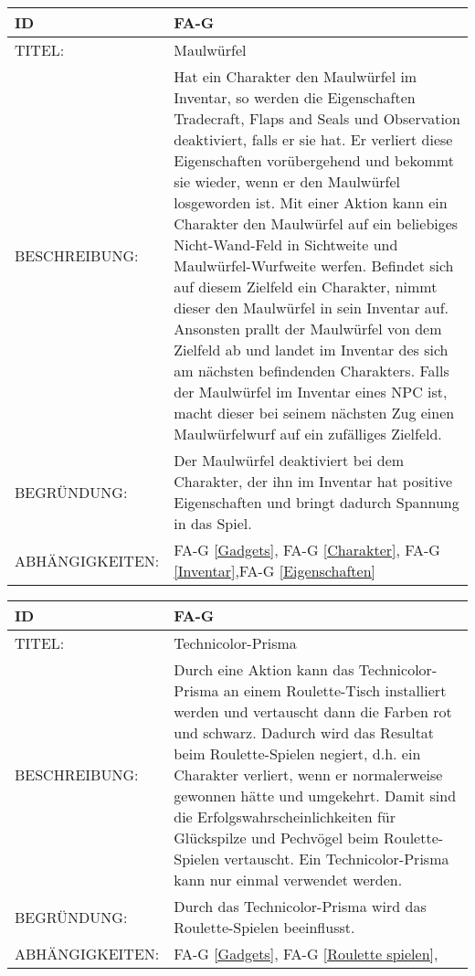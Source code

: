 \begin{tabularx}{16cm}{l|X}
	{table}\label{Maulwuerfel}
	\textbf{ID} & \textbf{FA-G \arabic{table}} \\
	\hline
	TITEL: & Maulwürfel \\
	\hline
	BESCHREIBUNG: & Hat ein Charakter den Maulwürfel im Inventar, so werden die Eigenschaften Tradecraft, Flaps and Seals und Observation deaktiviert, falls er sie hat. Er verliert diese Eigenschaften vorübergehend und bekommt sie wieder, wenn er den Maulwürfel losgeworden ist. Mit einer Aktion kann ein Charakter den Maulwürfel auf ein beliebiges Nicht-Wand-Feld in Sichtweite und Maulwürfel-Wurfweite werfen. Befindet sich auf diesem Zielfeld ein Charakter, nimmt dieser den Maulwürfel in sein Inventar auf. Ansonsten prallt der Maulwürfel von dem Zielfeld ab und landet im Inventar des sich am nächsten befindenden Charakters. Falls der Maulwürfel im Inventar eines NPC ist, macht dieser bei seinem nächsten Zug einen Maulwürfelwurf auf ein zufälliges Zielfeld. \\
	\hline
	BEGRÜNDUNG: &  Der Maulwürfel deaktiviert bei dem Charakter, der ihn im Inventar hat positive Eigenschaften und bringt dadurch Spannung in das Spiel. \\
	\hline
	ABHÄNGIGKEITEN: & FA-G \ref{Gadgets}, FA-G \ref{Charakter}, FA-G \ref{Inventar},FA-G \ref{Eigenschaften} \\
\end{tabularx}

\begin{tabularx}{16cm}{l|X}
	{table}\label{Technicolor-Prisma}
	\textbf{ID} & \textbf{FA-G \arabic{table}} \\
	\hline
	TITEL: & Technicolor-Prisma \\
	\hline
	BESCHREIBUNG: & Durch eine Aktion kann das Technicolor-Prisma an einem Roulette-Tisch installiert werden und vertauscht dann die Farben rot und schwarz. Dadurch wird das Resultat beim Roulette-Spielen negiert, d.h. ein Charakter verliert, wenn er normalerweise gewonnen hätte und umgekehrt. Damit sind die Erfolgswahrscheinlichkeiten für Glückspilze und Pechvögel beim Roulette-Spielen vertauscht. Ein Technicolor-Prisma kann nur einmal verwendet werden. \\
	\hline
	BEGRÜNDUNG: &  Durch das Technicolor-Prisma wird das Roulette-Spielen beeinflusst. \\
	\hline
	ABHÄNGIGKEITEN: & FA-G \ref{Gadgets}, FA-G \ref{Roulette spielen}, \\
\end{tabularx}

